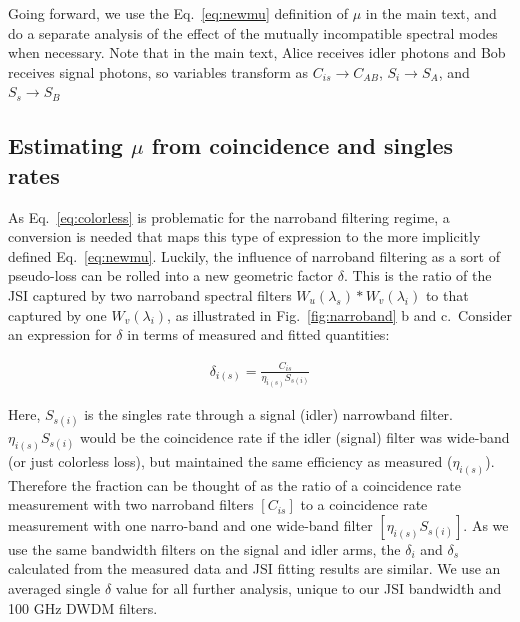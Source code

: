 \documentclass[11pt]{caltech_thesis} %
\begin{document}
Going forward, we use the Eq.~\ref{eq:newmu} definition of $\mu$ in the main text, and do a separate analysis of the effect of the mutually incompatible spectral modes when necessary. Note that in the main text, Alice receives idler photons and Bob receives signal photons, so variables transform as $C_{is} \rightarrow C_{AB}$, $S_{i} \rightarrow S_{A}$, and $S_{s} \rightarrow S_{B}$

\hypertarget{estimating-ux3bc-from-coincidence-and-singles-rates}{%
\subsection{\texorpdfstring{Estimating \texorpdfstring{$\mu$}{mu} from coincidence and singles rates}{Estimating  from coincidence and singles rates}}\label{estimating-ux3bc-from-coincidence-and-singles-rates}}

As Eq.~\ref{eq:colorless} is problematic for the narroband filtering regime, a conversion is needed that maps this type of expression to the more implicitly defined Eq.~\ref{eq:newmu}. Luckily, the influence of narroband filtering as a sort of pseudo-loss can be rolled into a new geometric factor $\delta$. This is the ratio of the JSI captured by two narroband spectral filters $W_u(\lambda_s)*W_v(\lambda_i)$ to that captured by one $W_v(\lambda_i)$, as illustrated in Fig.~\ref{fig:narroband} b and c.~Consider an expression for $\delta$ in terms of measured and fitted quantities:

\hypertarget{eq:new_eff}{}{
\begin{align} 
\delta_{i(s)} = \frac{C_{is}}{\eta_{i(s)}S_{s(i)}} \label{eq:new_eff}
\end{align}
}

Here, $S_{s(i)}$ is the singles rate through a signal (idler) narrowband filter. $\eta_{i(s)}S_{s(i)}$ would be the coincidence rate if the idler (signal) filter was wide-band (or just colorless loss), but maintained the same efficiency as measured ($\eta_{i(s)}$). Therefore the fraction can be thought of as the ratio of a coincidence rate measurement with two narroband filters $[C_{is}]$ to a coincidence rate measurement with one narro-band and one wide-band filter $[\eta_{i(s)}S_{s(i)}]$. As we use the same bandwidth filters on the signal and idler arms, the $\delta_i$ and $\delta_s$ calculated from the measured data and JSI fitting results are similar. We use an averaged single $\delta$ value for all further analysis, unique to our JSI bandwidth and 100 GHz DWDM filters.
\end{document}
